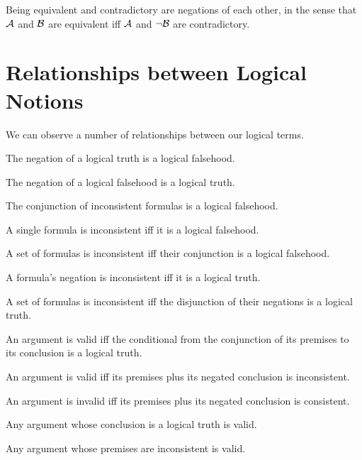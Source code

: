 \documentclass[PHIL101-Textbook.tex]{subfiles}
\begin{document}
Being equivalent and contradictory are negations of each other, in the sense that $\mathcal{A}$ and $\mathcal{B}$ are equivalent iff $\mathcal{A}$ and $\neg\mathcal{B}$ are contradictory.



\section{Relationships between Logical Notions}
We can observe a number of relationships between our logical terms.

\begin{earg}
\item The negation of a logical truth is a logical falsehood.
\item The negation of a logical falsehood is a logical truth.\\

\item The conjunction of inconsistent formulas is a logical falsehood.
\item A single formula is inconsistent iff it is a logical falsehood.
\item A set of formulas is inconsistent iff their conjunction is a logical falsehood.
\item A formula's negation is inconsistent iff it is a logical truth.
\item A set of formulas is inconsistent iff the disjunction of their negations is a logical truth.\\

\item An argument is valid iff the conditional from the conjunction of its premises to its conclusion is a logical truth.
\item An argument is valid iff its premises plus its negated conclusion is inconsistent.
\item An argument is invalid iff its premises plus its negated conclusion is consistent.
\item Any argument whose conclusion is a logical truth is valid.
\item Any argument whose premises are inconsistent is valid.\\


\end{earg}
\end{document}
